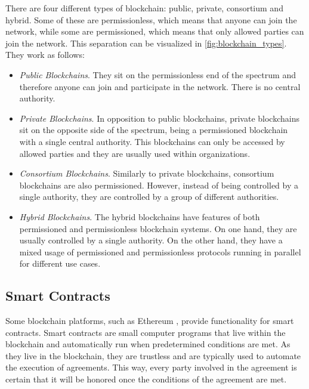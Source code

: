 There are four different types of blockchain: public, private, consortium and hybrid. Some of these are permissionless, which means that anyone can join the network, while some are permissioned, which means that only allowed parties can join the network. This separation can be visualized in \autoref{fig:blockchain_types}. They work as follows:

\begin{itemize}
    \item \textit{Public Blockchains}. They sit on the permissionless end of the spectrum and therefore anyone can join and participate in the network. There is no central authority.

    \item \textit{Private Blockchains}. In opposition to public blockchains, private blockchains sit on the opposite side of the spectrum, being a permissioned blockchain with a single central authority. This blockchains can only be accessed by allowed parties and they are usually used within organizations.

    \item \textit{Consortium Blockchains}. Similarly to private blockchains, consortium blockchains are also permissioned. However, instead of being controlled by a single authority, they are controlled by a group of different authorities.

    \item \textit{Hybrid Blockchains}. The hybrid blockchains have features of both permissioned and permissionless blockchain systems. On one hand, they are usually controlled by a single authority. On the other hand, they have a mixed usage of permissioned and permissionless protocols running in parallel for different use cases.
\end{itemize}

\subsection{Smart Contracts}\label{background:smart_contracts}

Some blockchain platforms, such as Ethereum \cite{wood2014ethereum}, provide functionality for smart contracts. Smart contracts are small computer programs that live within the blockchain and automatically run when predetermined conditions are met. As they live in the blockchain, they are trustless and are typically used to automate the execution of agreements. This way, every party involved in the agreement is certain that it will be honored once the conditions of the agreement are met.

